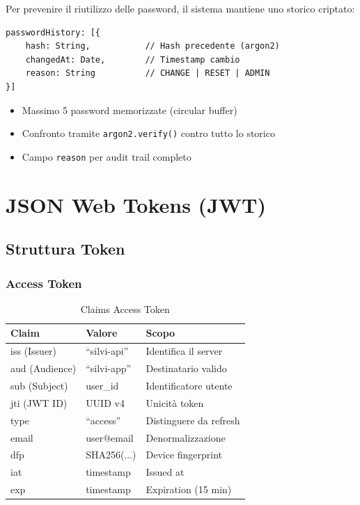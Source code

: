 \documentclass[12pt,a4paper]{report}
\begin{document}
Per prevenire il riutilizzo delle password, il sistema mantiene uno storico criptato:

\begin{lstlisting}[caption={Schema Password History}, label={lst:passhistory}]
passwordHistory: [{
    hash: String,           // Hash precedente (argon2)
    changedAt: Date,        // Timestamp cambio
    reason: String          // CHANGE | RESET | ADMIN
}]
\end{lstlisting}

\begin{itemize}
    \item Massimo 5 password memorizzate (circular buffer)
    \item Confronto tramite \texttt{argon2.verify()} contro tutto lo storico
    \item Campo \texttt{reason} per audit trail completo
\end{itemize}

\chapter{JSON Web Tokens (JWT)}

\section{Struttura Token}

\subsection{Access Token}

\begin{table}[H]
\centering
\begin{tabular}{@{}lll@{}}
\toprule
\textbf{Claim} & \textbf{Valore} & \textbf{Scopo} \\
\midrule
iss (Issuer) & ``silvi-api'' & Identifica il server \\
aud (Audience) & ``silvi-app'' & Destinatario valido \\
sub (Subject) & user\_id & Identificatore utente \\
jti (JWT ID) & UUID v4 & Unicità token \\
type & ``access'' & Distinguere da refresh \\
email & user@email & Denormalizzazione \\
dfp & SHA256(...) & Device fingerprint \\
iat & timestamp & Issued at \\
exp & timestamp & Expiration (15 min) \\
\bottomrule
\end{tabular}
\caption{Claims Access Token}
\end{table}
\end{document}
